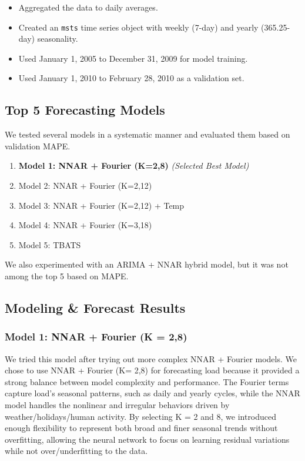 \documentclass[
]{article}
\providecommand{\tightlist}{%
  \setlength{\itemsep}{0pt}\setlength{\parskip}{0pt}}
\begin{document}
\begin{itemize}
\tightlist
\item
  Aggregated the data to daily averages.
\item
  Created an \texttt{msts} time series object with weekly (7-day) and
  yearly (365.25-day) seasonality.
\item
  Used January 1, 2005 to December 31, 2009 for model training.
\item
  Used January 1, 2010 to February 28, 2010 as a validation set.
\end{itemize}

\subsection{Top 5 Forecasting Models}\label{top-5-forecasting-models}

We tested several models in a systematic manner and evaluated them based
on validation MAPE.

\begin{enumerate}
\def\labelenumi{\arabic{enumi}.}
\tightlist
\item
  \textbf{Model 1: NNAR + Fourier (K=2,8)} \emph{(Selected Best Model)}
\item
  Model 2: NNAR + Fourier (K=2,12)
\item
  Model 3: NNAR + Fourier (K=2,12) + Temp
\item
  Model 4: NNAR + Fourier (K=3,18)
\item
  Model 5: TBATS
\end{enumerate}

We also experimented with an ARIMA + NNAR hybrid model, but it was not
among the top 5 based on MAPE.

\subsection{Modeling \& Forecast
Results}\label{modeling-forecast-results}

\subsubsection{Model 1: NNAR + Fourier (K =
2,8)}\label{model-1-nnar-fourier-k-28}

We tried this model after trying out more complex NNAR + Fourier models.
We chose to use NNAR + Fourier (K= 2,8) for forecasting load because it
provided a strong balance between model complexity and performance. The
Fourier terms capture load's seasonal patterns, such as daily and yearly
cycles, while the NNAR model handles the nonlinear and irregular
behaviors driven by weather/holidays/human activity. By selecting K = 2
and 8, we introduced enough flexibility to represent both broad and
finer seasonal trends without overfitting, allowing the neural network
to focus on learning residual variations while not over/underfitting to
the data.
\end{document}
